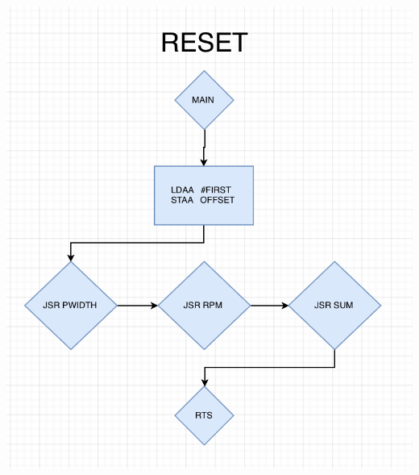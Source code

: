 \documentclass[12pt]{report}
\begin{document}
\begin{center}
     \includegraphics[scale=0.66]{reset.PNG}\\

\end{center}
\end{document}
